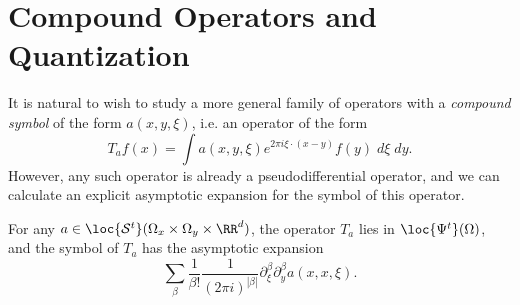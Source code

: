 \section{Compound Operators and Quantization}

It is natural to wish to study a more general family of operators with a \emph{compound symbol} of the form $a(x,y,\xi)$, i.e. an operator of the form
%
\[ T_a f(x) = \int a(x,y,\xi) e^{2 \pi i \xi \cdot (x - y)} f(y)\; d\xi\; dy. \]
%
However, any such operator is already a pseudodifferential operator, and we can calculate an explicit asymptotic expansion for the symbol of this operator.

\begin{lemma}
    For any $a \in \loc{\mathcal{S}^t}(\Omega_x \times \Omega_y \times \RR^d)$, the operator $T_a$ lies in $\loc{\Psi^t}(\Omega)$, and the symbol of $T_a$ has the asymptotic expansion
    \[ \sum_\beta \frac{1}{\beta!} \frac{1}{(2 \pi i)^{|\beta|}} \partial^\beta_\xi \partial^\beta_y a(x,x,\xi). \]
\end{lemma}
